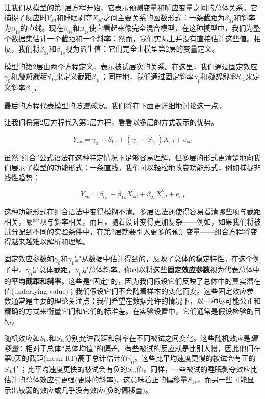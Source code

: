 \documentclass[
]{book}
\begin{document}
让我们从模型的第1层方程开始，它表示预测变量和响应变量之间的总体关系。它捕捉了反应时\(Y_{sd}\)和睡眠剥夺\(X_{sd}\)之间主要关系的函数形式：一条截距为\(\beta_{0s}\)和斜率为\(\beta_{1s}\)的直线。现在\(\beta_{0s}\)和\(\beta_{1s}\)使它看起来像完全混合模型，在这种模型中，我们为整个数据集估计一个截距和一个斜率；然而，我们实际上并没有直接估计这些值。相反，我们将\(\beta_{0s}\)和\(\beta_{1s}\)视为派生值：它们完全由模型第2层的变量定义。

模型的第2层由两个方程定义，表示被试层次的关系。在这里，我们通过固定效应\(\gamma_0\)和\emph{随机截距}\(S_{0s}\)来定义截距\(\beta_{0s}\)；同样地，我们通过固定斜率\(\gamma_1\)和\emph{随机斜率}\(S_{1s}\)来定义斜率\(\beta_{1s}\)。

最后的方程代表模型的\emph{方差成分}。我们将在下面更详细地讨论这一点。

让我们将第2层方程代入第1层方程，看看以多层的方式表示的优势。

\begin{equation}
Y_{sd} = \gamma_{0} + S_{0s} + \left(\gamma_{1} + S_{1s}\right) X_{sd} + e_{sd}
\end{equation}

虽然``组合''公式语法在这种特定情况下足够容易理解，但多层的形式更清楚地向我们展示了模型的功能形式：一条直线。我们可以轻松地改变功能形式，例如捕捉非线性趋势：

\[Y_{sd} = \beta_{0s} + \beta_{1s} X_{sd} + \beta_{2s} X_{sd}^2 + e_{sd}\]

这种功能形式在组合语法中变得模糊不清。多层语法还使得容易看清哪些项与截距相关，哪些项与斜率相关。而且，随着设计变得更加复杂------例如，如果我们将被试分配到不同的实验条件中，在第2层就要引入更多的预测变量------组合方程将变得越来越难以解析和理解。

固定效应参数如\(\gamma_0\)和\(\gamma_1\)是从数据中估计得到的，反映了总体的稳定特性。在这个例子中，\(\gamma_0\)是总体截距，\(\gamma_1\)是总体斜率。你可以将这些\textbf{固定效应参数}视为代表总体中的\textbf{平均截距和斜率}。这些是``固定''的，因为我们假设它们反映了总体中的真实潜在值(underlying value)；我们假设它们不会随着样本的变化而变。这些固定效应参数通常是主要的理论关注点；我们希望在数据允许的情况下，以一种尽可能公正和精确的方式来衡量它们和它们的标准差。在实验设置中，它们通常是假设检验的目标。

随机效应如\(S_{0i}\)和\(S_{1i}\)分别允许截距和斜率在不同被试之间变化。这些随机效应是\emph{偏移量}：相对于总体``总体均值''的偏差。有些被试的反应就是比别人慢，因此他们在第0天的截距(mean RT)高于总计估计值\(\hat{\gamma_0}\)。这些比平均速度更慢的被试会有正的\(S_{0i}\)值；比平均速度更快的被试会有负的\(S_{0i}\)值。同样，一些被试的睡眠剥夺效应比估计的总体效应\(\hat{\gamma_1}\)更强(更陡的斜率)，这意味着正的偏移量\(S_{1s}\)，而另一些可能显示出较弱的效应或几乎没有效应(负的偏移量)。
\end{document}
